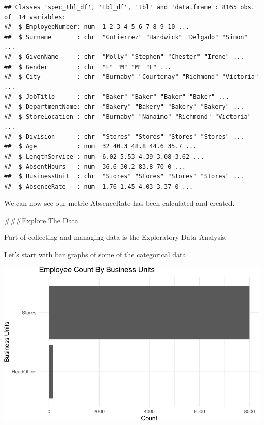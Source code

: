 \documentclass[12pt, krantz2,]{krantz}
\makeatletter
\newenvironment{Shaded}{\begin{snugshade}}{\end{snugshade}}
\newcommand{\DataTypeTok}[1]{\textcolor[rgb]{0.27,0.27,0.27}{#1}}
\newcommand{\KeywordTok}[1]{\textcolor[rgb]{0.27,0.27,0.27}{\textbf{#1}}}
\newcommand{\NormalTok}[1]{#1}
\newcommand{\OperatorTok}[1]{\textcolor[rgb]{0.43,0.43,0.43}{\textbf{#1}}}
\newcommand{\StringTok}[1]{\textcolor[rgb]{0.5,0.5,0.5}{#1}}
\newenvironment{kframe}{%
\medskip{}
\setlength{\fboxsep}{.8em}
 \def\at@end@of@kframe{}%
 \ifinner\ifhmode%
  \def\at@end@of@kframe{\end{minipage}}%
  \begin{minipage}{\columnwidth}%
 \fi\fi%
 \def\FrameCommand##1{\hskip\@totalleftmargin \hskip-\fboxsep
 \colorbox{shadecolor}{##1}\hskip-\fboxsep
     \hskip-\linewidth \hskip-\@totalleftmargin \hskip\columnwidth}%
 \MakeFramed {\advance\hsize-\width
   \@totalleftmargin\z@ \linewidth\hsize
   \@setminipage}}%
 {\par\unskip\endMakeFramed%
 \at@end@of@kframe}
\renewenvironment{Shaded}{\begin{kframe}}{\end{kframe}}
\makeatother
\begin{document}
\begin{verbatim}
## Classes 'spec_tbl_df', 'tbl_df', 'tbl' and 'data.frame': 8165 obs. of  14 variables:
##  $ EmployeeNumber: num  1 2 3 4 5 6 7 8 9 10 ...
##  $ Surname       : chr  "Gutierrez" "Hardwick" "Delgado" "Simon" ...
##  $ GivenName     : chr  "Molly" "Stephen" "Chester" "Irene" ...
##  $ Gender        : chr  "F" "M" "M" "F" ...
##  $ City          : chr  "Burnaby" "Courtenay" "Richmond" "Victoria" ...
##  $ JobTitle      : chr  "Baker" "Baker" "Baker" "Baker" ...
##  $ DepartmentName: chr  "Bakery" "Bakery" "Bakery" "Bakery" ...
##  $ StoreLocation : chr  "Burnaby" "Nanaimo" "Richmond" "Victoria" ...
##  $ Division      : chr  "Stores" "Stores" "Stores" "Stores" ...
##  $ Age           : num  32 40.3 48.8 44.6 35.7 ...
##  $ LengthService : num  6.02 5.53 4.39 3.08 3.62 ...
##  $ AbsentHours   : num  36.6 30.2 83.8 70 0 ...
##  $ BusinessUnit  : chr  "Stores" "Stores" "Stores" "Stores" ...
##  $ AbsenceRate   : num  1.76 1.45 4.03 3.37 0 ...
\end{verbatim}

We can now see our metric AbsenceRate has been calculated and created.

\#\#\#Explore The Data

Part of collecting and managing data is the Exploratory Data Analysis.

Let's start with bar graphs of some of the categorical data

\begin{Shaded}
\end{Shaded}

\includegraphics[width=\textwidth]{hendrikfeddersen_files/figure-latex/unnamed-chunk-7-1}
\end{document}
